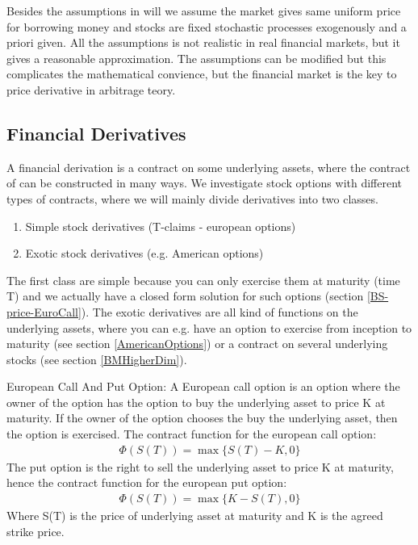Besides the assumptions in \parencite{finKont} will we assume the market gives same uniform price for borrowing money and stocks are fixed stochastic processes exogenously and a priori given. All the assumptions is not realistic in real financial markets, but it gives a reasonable approximation.  The assumptions can be modified but this complicates the mathematical convience, but the financial market is the key to price derivative in arbitrage teory.


\subsection{Financial Derivatives}
A financial derivation is a contract on some underlying assets, where the contract of can be constructed in many ways. We investigate stock options with different types of contracts, where we will mainly divide derivatives into two classes. 
\begin{enumerate}
\item Simple stock derivatives (T-claims - european options)
\item Exotic stock derivatives (e.g. American options)
\end{enumerate}
The first class are simple because you can only exercise them at maturity (time T) and we actually have a closed form solution for such options (section \ref{BS-price-EuroCall}). The exotic derivatives are all kind of functions on the underlying assets, where you can e.g. have an option to exercise from inception to maturity (see section \ref{AmericanOptions}) or a contract on several underlying stocks (see section \ref{BMHigherDim}).

\theoremstyle{definition}
\begin{definition}{European Call And Put Option:}\label{def:CallOptions}
A European call option is an option where the owner of the option has the option to buy the underlying asset to price K at maturity. If the owner of the option chooses the buy the underlying asset, then the option is exercised. The contract function for the european call option:
\begin{equation}
\begin{split}
\Phi(S(T))=\max\{S(T)-K, 0\}
\end{split}
\end{equation}
The put option is the right to sell the underlying asset to price K at maturity, hence the contract function for the european put option:
\begin{equation}
\begin{split}
\Phi(S(T))=\max\{K-S(T), 0\}
\end{split}
\end{equation}
Where S(T) is the price of underlying asset at maturity and K is the agreed strike price.\\
\end{definition}

